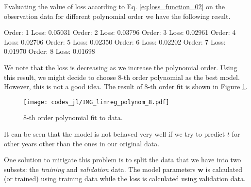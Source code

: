 Evaluating the value of loss according to Eq. \eqref{eq:loss_function_02}
on the observation data for different polynomial order
we have the following result.
\begin{textcode}
Order:   1 Loss:    0.05031
Order:   2 Loss:    0.03796
Order:   3 Loss:    0.02961
Order:   4 Loss:    0.02706
Order:   5 Loss:    0.02350
Order:   6 Loss:    0.02202
Order:   7 Loss:    0.01970
Order:   8 Loss:    0.01698    
\end{textcode}
We note that the loss is decreasing as we increase the polynomial order.
Using this result, we might decide to choose 8-th order polynomial as the
best model. However, this is not a good idea.
The result of 8-th order fit is shown in Figure \ref{fig:8th_order_fit}.
\begin{figure}[h]
\begin{center}
\texttt{[image: codes\_jl/IMG\_linreg\_polynom\_8.pdf]}
\end{center}
\caption{8-th order polynomial fit to  data.}
\label{fig:8th_order_fit}
\end{figure}
It can be seen that the model is not behaved very well if we try to predict
$t$ for other years other than the ones in our original data.

One solution to mitigate this problem is to split the data that we have
into two subsets: the \emph{training} and \emph{validation} data.
The model parameters $\mathbf{w}$ is calculated (or trained) using
training data while the loss is calculated using validation data.

